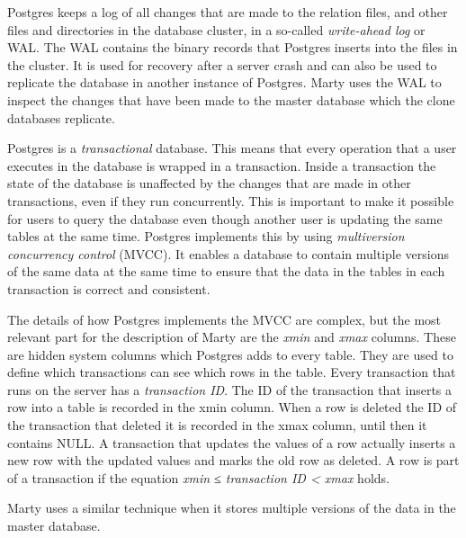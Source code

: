 Postgres keeps a log of all changes that are made to the relation files, and other files and directories in the database cluster, in a so-called \textit{write-ahead log} or WAL.
The WAL contains the binary records that Postgres inserts into the files in the cluster.
It is used for recovery after a server crash and can also be used to replicate the database in another instance of Postgres.
Marty uses the WAL to inspect the changes that have been made to the master database which the clone databases replicate.

Postgres is a \textit{transactional} database.
This means that every operation that a user executes in the database is wrapped in a transaction.
Inside a transaction the state of the database is unaffected by the changes that are made in other transactions, even if they run concurrently.
This is important to make it possible for users to query the database even though another user is updating the same tables at the same time.
Postgres implements this by using \textit{multiversion concurrency control} (MVCC).
It enables a database to contain multiple versions of the same data at the same time to ensure that the data in the tables in each transaction is correct and consistent.

The details of how Postgres implements the MVCC are complex, but the most relevant part for the description of Marty are the \textit{xmin} and \textit{xmax} columns.
These are hidden system columns which Postgres adds to every table.
They are used to define which transactions can see which rows in the table.
Every transaction that runs on the server has a \textit{transaction ID}.
The ID of the transaction that inserts a row into a table is recorded in the xmin column.
When a row is deleted the ID of the transaction that deleted it is recorded in the xmax column, until then it contains NULL.
A transaction that updates the values of a row actually inserts a new row with the updated values and marks the old row as deleted.
A row is part of a transaction if the equation \textit{xmin ≤ transaction ID < xmax} holds.

Marty uses a similar technique when it stores multiple versions of the data in the master database.
